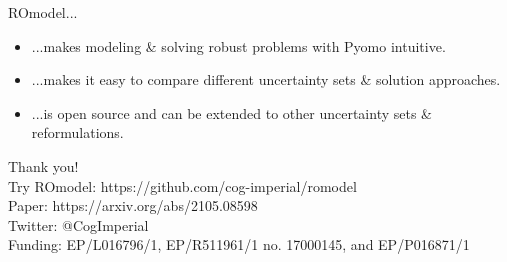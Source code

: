 \documentclass[slides,aspectratio=169]{beamer}
\begin{document}
\begin{frame}
    ROmodel...
    \begin{itemize}
        \item ...makes modeling \& solving robust problems with Pyomo
            intuitive.
        \item ...makes it easy to compare different uncertainty sets \&
            solution approaches.
        \item ...is open source and can be extended to other uncertainty
            sets \& reformulations.
    \end{itemize}
    \vspace{-1em}
    \centering
    \LARGE
    Thank you!\\[1em]
    \normalsize
    Try ROmodel: {\color{imperialDarkBlue}https://github.com/cog-imperial/romodel}\\
    Paper: {\color{imperialDarkBlue}https://arxiv.org/abs/2105.08598}\\
    Twitter: {\color{icOrange}@CogImperial}\\[2em]
    \tiny
    Funding: EP/L016796/1, EP/R511961/1 no. 17000145, and EP/P016871/1
\end{frame}




\appendix
\begin{frame}[allowframebreaks]
    \tiny
    
    
\end{frame}
\end{document}
